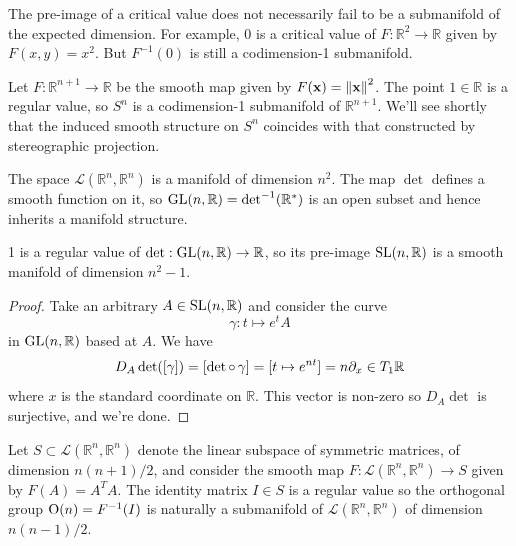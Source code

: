 \documentclass[a4paper,11pt]{article}
\begin{document}
	\begin{rmk}
		The pre-image of a critical value does not necessarily fail to be a submanifold of the expected dimension. For example, 0 is a critical value of $F : \mathbb{R}^2 \to \mathbb{R}$ given by $F(x,y) = x^2$. But $F^{-1}(0)$ is still a codimension-1 submanifold. 
	\end{rmk}

	\begin{ex}
		Let $F : \mathbb{R}^{n+1} \to \mathbb{R}$ be the smooth map given by $F(\vb x) = \norm{\vb x}^2$. The point $1 \in \mathbb{R}$ is a regular value, so $S^n$ is a codimension-1 submanifold of $\mathbb{R}^{n+1}$. We'll see shortly that the induced smooth structure on $S^n$ coincides with that constructed by stereographic projection.
	\end{ex}

	\begin{ex}
		The space $\mathcal{L}(\mathbb{R}^n , \mathbb{R}^n)$ is a manifold of dimension $n^2$. The map $\det$ defines a smooth function on it, so $\operatorname{GL}(n, \mathbb{R}) = \det^{-1}(\mathbb{R}^*)$ is an open subset and hence inherits a manifold structure. 
	\end{ex}

	\begin{clm*}
		1 is a regular value of $\det : \operatorname{GL}(n, \mathbb{R}) \to \mathbb{R}$, so its pre-image $\operatorname{SL}(n, \mathbb{R})$ is a smooth manifold of dimension $n^2 - 1$. 
	\end{clm*}

	\begin{proof}
		Take an arbitrary $A \in \operatorname{SL}(n,\mathbb{R})$ and consider the curve
		\[
			\gamma : t \mapsto e^t A
		\]
		in $\operatorname{GL}(n,\mathbb{R})$ based at $A$. We have
		\[
			D_A \det([\gamma]) = [\det \operatorname{\circ} \gamma] = [t \mapsto e ^{nt}] = n \partial_x \in T_1 \mathbb{R}
		\]
		where $x$ is the standard coordinate on $\mathbb{R}$. This vector is non-zero so $D_A \det$ is surjective, and we're done.
	\end{proof}

	\begin{ex}
		Let $S \subset \mathcal{L}(\mathbb{R}^n, \mathbb{R}^n)$ denote the linear subspace of symmetric matrices, of dimension $n(n+1)/2$, and consider the smooth map $F: \mathcal{L}(\mathbb{R}^n, \mathbb{R}^n) \to S$ given by $F(A) = A^T A$. The identity matrix $I \in S$ is a regular value so the orthogonal group $\operatorname{O}(n) = F^{-1}(I)$ is naturally a submanifold of $\mathcal{L}(\mathbb{R}^n,\mathbb{R}^n)$ of dimension $n(n-1)/2$.  
	\end{ex}
\end{document}

